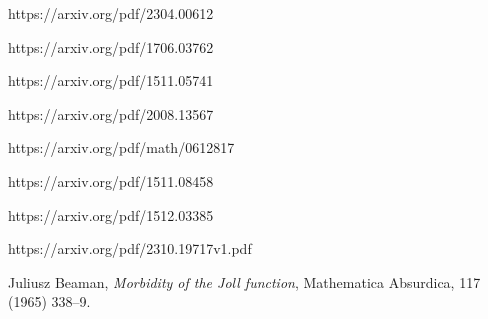 
\begin{thebibliography}{99}

	 https://arxiv.org/pdf/2304.00612

	 https://arxiv.org/pdf/1706.03762

	 https://arxiv.org/pdf/1511.05741

	 https://arxiv.org/pdf/2008.13567

	 https://arxiv.org/pdf/math/0612817


	 https://arxiv.org/pdf/1511.08458

	 https://arxiv.org/pdf/1512.03385



	\bibitem[]{} https://arxiv.org/pdf/2310.19717v1.pdf

	 Juliusz Beaman, \textit{Morbidity of the Joll function}, Mathematica Absurdica, 117 (1965) 338--9.


\end{thebibliography}
